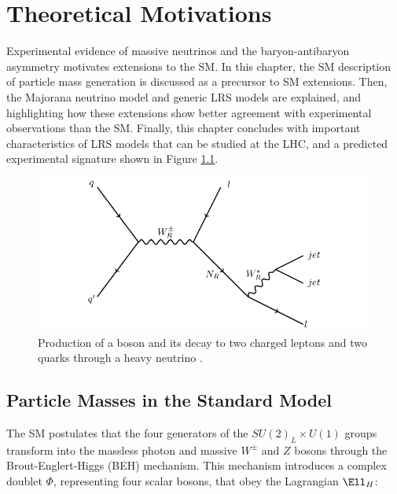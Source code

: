 \chapter{Theoretical Motivations}
\label{wrBosonAndHeavyNu}
Experimental evidence of massive neutrinos and the baryon-antibaryon asymmetry motivates extensions to the SM.  
In this chapter, the SM description of particle mass generation is discussed as a precursor to SM extensions.  
Then, the Majorana neutrino model and generic LRS models are explained, and highlighting how these extensions 
show better agreement with experimental observations than the SM.  Finally, this chapter concludes with 
important characteristics of LRS models that can be studied at the LHC, and a predicted experimental signature 
shown in Figure \ref{fig:wrFeynmanDiagram}.

\begin{figure}[h]
	\centering
	\includegraphics[width=1.0\textwidth]{figures/feynman.pdf}
	\caption{Production of a \WR boson and its decay to two charged leptons and two quarks through 
	a heavy neutrino \nul.}
	\label{fig:wrFeynmanDiagram}
\end{figure}


\section{Particle Masses in the Standard Model}
\label{sec:massInSM}
The SM postulates that the four generators of the $SU(2)_{L} \times U(1)$ groups transform into the massless 
photon and massive $W^{\pm}$ and $Z$ bosons through the Brout-Englert-Higgs (BEH) mechanism.  This mechanism 
introduces a complex doublet $\Phi$, representing four scalar bosons, that obey the Lagrangian $\Ell_{H}$:

